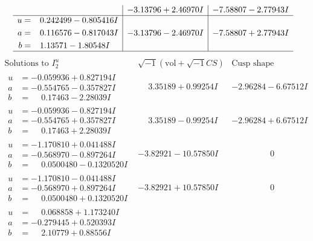 \documentclass[1p]{elsarticle_modified}
\theoremstyle{definition}
\newcommand{\I}{\sqrt{-1}}
\begin{document}
$$\begin{array}{c|c|c}
 & -3.13796 + 2.46970 I & -7.58807 - 2.77943 I \\ \hline\begin{aligned}
u &= \phantom{-}0.242499 - 0.805416 I \\
a &= \phantom{-}0.116576 - 0.817043 I \\
b &= \phantom{-}1.13571 - 1.80548 I\end{aligned}
 & -3.13796 - 2.46970 I & -7.58807 + 2.77943 I\\
 \hline 
 \end{array}$$\newpage$$\begin{array}{c|c|c}  
\text{Solutions to }I^u_{2}& \I (\text{vol} + \sqrt{-1}CS) & \text{Cusp shape}\\
 \hline 
\begin{aligned}
u &= -0.059936 + 0.827194 I \\
a &= -0.554765 - 0.357827 I \\
b &= \phantom{-}0.17463 - 2.28039 I\end{aligned}
 & \phantom{-}3.35189 + 0.99254 I & -2.96284 - 6.67512 I \\ \hline\begin{aligned}
u &= -0.059936 - 0.827194 I \\
a &= -0.554765 + 0.357827 I \\
b &= \phantom{-}0.17463 + 2.28039 I\end{aligned}
 & \phantom{-}3.35189 - 0.99254 I & -2.96284 + 6.67512 I \\ \hline\begin{aligned}
u &= -1.170810 + 0.041488 I \\
a &= -0.568970 - 0.897264 I \\
b &= \phantom{-}0.0500480 - 0.1320520 I\end{aligned}
 & -3.82921 - 10.57850 I & \phantom{-0.000000 } 0 \\ \hline\begin{aligned}
u &= -1.170810 - 0.041488 I \\
a &= -0.568970 + 0.897264 I \\
b &= \phantom{-}0.0500480 + 0.1320520 I\end{aligned}
 & -3.82921 + 10.57850 I & \phantom{-0.000000 } 0 \\ \hline\begin{aligned}
u &= \phantom{-}0.068858 + 1.173240 I \\
a &= -0.279445 + 0.520393 I \\
b &= \phantom{-}2.10779 + 0.88556 I\end{aligned}

\end{array}$$
\end{document}
